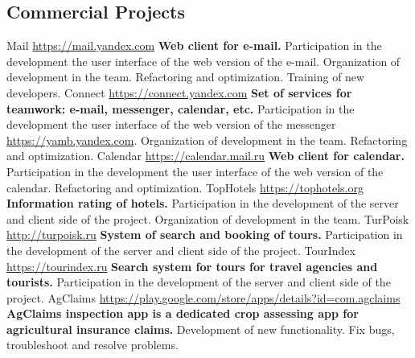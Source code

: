 \documentclass[11pt,a4paper]{moderncv}
\begin{document}
  \subsection{Commercial Projects}
  \cvline
    {Mail}
    {\url{https://mail.yandex.com}\newline{}
    \textbf{Web client for e-mail.}\newline{}
    Participation in the development the user interface of the web version of the e-mail.\newline{}
    Organization of development in the team.\newline{}
    Refactoring and optimization.\newline{}
    Training of new developers.}
  \cvline
    {Connect}
    {\url{https://connect.yandex.com}\newline{}
    \textbf{Set of services for teamwork: e-mail, messenger, calendar, etc.}\newline{}
    Participation in the development the user interface of the web version of the messenger
    \url{https://yamb.yandex.com}.\newline{}
    Organization of development in the team.\newline{}
    Refactoring and optimization.}
  \cvline
    {Calendar}
    {\url{https://calendar.mail.ru}\newline{}
    \textbf{Web client for calendar.}\newline{}
    Participation in the development the user interface of the web version of the calendar.\newline{}
    Refactoring and optimization.}
  \cvline
    {TopHotels}
    {\url{https://tophotels.org}\newline{}
    \textbf{Information rating of hotels.}\newline{}
    Participation in the development of the server and client side of the project.\newline{}
    Organization of development in the team.}
  \cvline
    {TurPoisk}
    {\url{http://turpoisk.ru}\newline{}
    \textbf{System of search and booking of tours.}\newline{}
    Participation in the development of the server and client side of the project.}
  \cvline
    {TourIndex}
    {\url{https://tourindex.ru}\newline{}
    \textbf{Search system for tours for travel agencies and tourists.}\newline{}
    Participation in the development of the server and client side of the project.}
  \cvline
    {AgClaims}
    {\url{https://play.google.com/store/apps/details?id=com.agclaims}\newline{}
    \textbf{AgClaims inspection app is a dedicated crop assessing app for agricultural insurance claims.}\newline{}
    Development of new functionality. Fix bugs, troubleshoot and resolve problems.}
\end{document}
